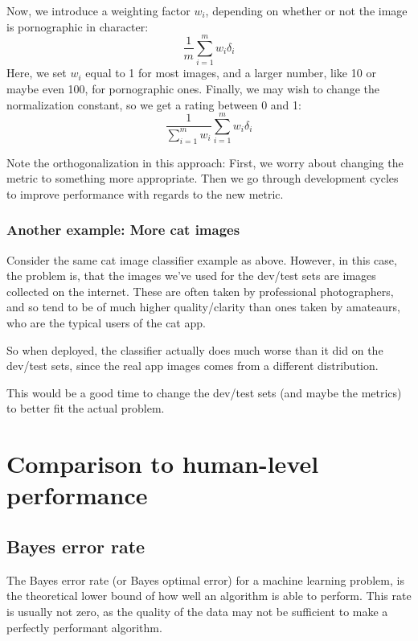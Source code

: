 \documentclass[12pt, a4paper]{article}
\numberwithin{equation}{section}
\begin{document}
Now, we introduce a weighting factor $w_i$, depending on whether or not the image is pornographic in character:
\begin{equation}
\frac{1}{m}\sum_{i=1}^m w_i\delta_i
\end{equation}
Here, we set $w_i$ equal to 1 for most images, and a larger number, like 10 or maybe even 100, for pornographic ones. Finally, we may wish to change the normalization constant, so we get a rating between 0 and 1:
\begin{equation}
\frac{1}{\sum_{i=1}^m w_i}\sum_{i=1}^m w_i\delta_i
\end{equation}

Note the orthogonalization in this approach: First, we worry about changing the metric to something more appropriate. Then we go through development cycles to improve performance with regards to the new metric.

\subsubsection{Another example: More cat images}
Consider the same cat image classifier example as above. However, in this case, the problem is, that the images we've used for the dev/test sets are images collected on the internet. These are often taken by professional photographers, and so tend to be of much higher quality/clarity than ones taken by amateaurs, who are the typical users of the cat app.

So when deployed, the classifier actually does much worse than it did on the dev/test sets, since the real app images comes from a different distribution.

This would be a good time to change the dev/test sets (and maybe the metrics) to better fit the actual problem.

\section{Comparison to human-level performance}

\subsection{Bayes error rate}
The Bayes error rate (or Bayes optimal error) for a machine learning problem, is the theoretical lower bound of how well an algorithm is able to perform. This rate is usually not zero, as the quality of the data may not be sufficient to make a perfectly performant algorithm.
\end{document}
